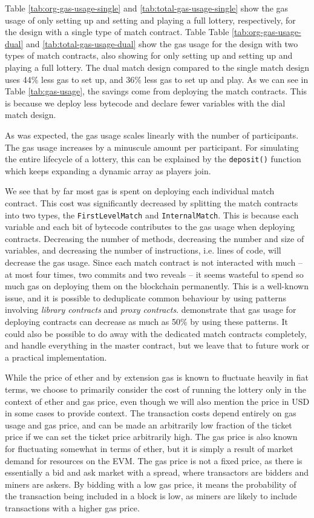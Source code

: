 \noindent
Table \ref{tab:org-gas-usage-single} and \ref{tab:total-gas-usage-single} show the gas usage of only setting up and setting and playing a full lottery, respectively, for the design with a single type of match contract. Table Table \ref{tab:org-gas-usage-dual} and \ref{tab:total-gas-usage-dual} show the gas usage for the design with two types of match contracts, also showing for only setting up and setting up and playing a full lottery.
The dual match design compared to the single match design uses 44\% less gas to set up, and 36\% less gas to set up and play. As we can see in Table \ref{tab:gas-usage}, the savings come from deploying the match contracts. This is because we deploy less bytecode and declare fewer variables with the dial match design.

As was expected, the gas usage scales linearly with the number of participants. The gas usage increases by a minuscule amount per participant. For simulating the entire lifecycle of a lottery, this can be explained by the \texttt{deposit()} function which keeps expanding a dynamic array as players join.

We see that by far most gas is spent on deploying each individual match contract. This cost was significantly decreased by splitting the match contracts into two types, the \texttt{FirstLevelMatch} and \texttt{InternalMatch}. This is because each variable and each bit of bytecode contributes to the gas usage when deploying contracts. Decreasing the number of methods, decreasing the number and size of variables, and decreasing the number of instructions, i.e. lines of code, will decrease the gas usage. Since each match contract is not interacted with much – at most four times, two commits and two reveals – it seems wasteful to spend so much gas on deploying them on the blockchain permanently. This is a well-known issue, and it is possible to deduplicate common behaviour by using patterns involving \emph{library contracts} and \emph{proxy contracts}. \cite{lu_solidity_2018} demonstrate that gas usage for deploying contracts can decrease as much as 50\% by using these patterns. It could also be possible to do away with the dedicated match contracts completely, and handle everything in the master contract, but we leave that to future work or a practical implementation.

While the price of ether and by extension gas is known to fluctuate heavily in fiat terms, we choose to primarily consider the cost of running the lottery only in the context of ether and gas price, even though we will also mention the price in USD in some cases to provide context. The transaction costs depend entirely on gas usage and gas price, and can be made an arbitrarily low fraction of the ticket price if we can set the ticket price arbitrarily high. The gas price is also known for fluctuating somewhat in terms of ether, but it is simply a result of market demand for resources on the EVM. The gas price is not a fixed price, as there is essentially a bid and ask market with a spread, where transactors are bidders and miners are askers. By bidding with a low gas price, it means the probability of the transaction being included in a block is low, as miners are likely to include transactions with a higher gas price.
